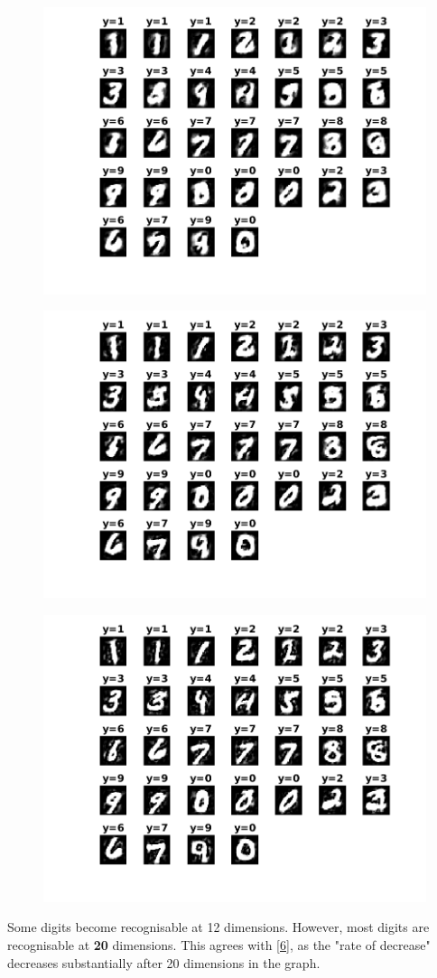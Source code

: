\documentclass{article}
\begin{document}
\begin{figure}[h!]
\begin{multicols}{3}
\includegraphics[width=1\columnwidth]{RunResults2/10.png}
\label{10}
\end{multicols}
\centering
\begin{multicols}{2}
\includegraphics[width=0.65\columnwidth]{RunResults2/11.png}
\label{11}

\includegraphics[width=0.65\columnwidth]{RunResults2/12.png}
\label{12}

\end{multicols}
\end{figure}
Some digits become recognisable at 12 dimensions. However, most digits are recognisable at \textbf{20} dimensions. This agrees with \ref{6}, as the "rate of decrease" decreases substantially after 20 dimensions in the graph. \\
\newpage
\end{document}
